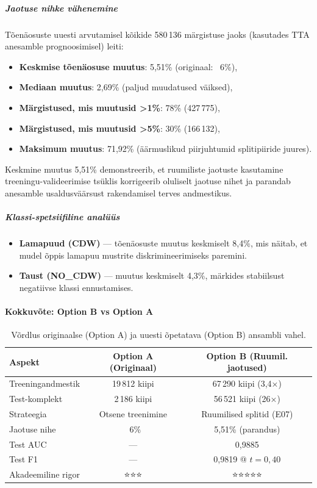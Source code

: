 \subparagraph{Jaotuse nihke vähenemine}

Tõenäosuste uuesti arvutamisel kõikide 580\,136 märgistuse jaoks (kasutades TTA
anesamble prognoosimisel) leiti:
\begin{itemize}
    \item \textbf{Keskmise tõenäosuse muutus}: 5,51\% (originaal: ~6\%),
    \item \textbf{Mediaan muutus}: 2,69\% (paljud muudatused väiksed),
    \item \textbf{Märgistused, mis muutusid >1\%}: 78\% (427\,775),
    \item \textbf{Märgistused, mis muutusid >5\%}: 30\% (166\,132),
    \item \textbf{Maksimum muutus}: 71,92\% (äärmuslikud piirjuhtumid splitipiiride juures).
\end{itemize}

Keskmine muutus 5,51\% demonstreerib, et ruumiliste jaotuste kasutamine
treeningu-valideerimise tsüklis korrigeerib oluliselt jaotuse nihet ja parandab
anesamble usaldusväärsust rakendamisel terves andmestikus.

\subparagraph{Klassi-spetsiifiline analüüs}

\begin{itemize}
    \item \textbf{Lamapuud (CDW)} — tõenäosuste muutus keskmiselt 8,4\%, mis näitab, et
          mudel õppis lamapuu mustrite diskrimineerimiseks paremini.
    \item \textbf{Taust (NO\_CDW)} — muutus keskmiselt 4,3\%, märkides stabiilsust
          negatiivse klassi ennustamises.
\end{itemize}

\paragraph{Kokkuvõte: Option B vs Option A}

\begin{table}[h!]
\centering
\caption{Võrdlus originaalse (Option A) ja uuesti õpetatava (Option B) ansambli vahel.}
\label{tab:option_comparison}
\begin{tabular}{lcc}
\hline
Aspekt & Option A (Originaal) & Option B (Ruumil. jaotused) \\
\hline
Treeningandmestik & 19\,812 kiipi & 67\,290 kiipi (3,4×) \\
Test-komplekt & 2\,186 kiipi & 56\,521 kiipi (26×) \\
Strateegia & Otsene treenimine & Ruumilised splitid (E07) \\
Jaotuse nihe & ~6\% & 5,51\% (parandus) \\
Test AUC & — & 0,9885 \\
Test F1 & — & 0,9819 @ $t=0,40$ \\
Akadeemiline rigor & ⭐⭐⭐ & ⭐⭐⭐⭐⭐ \\
\hline
\end{tabular}
\end{table}

